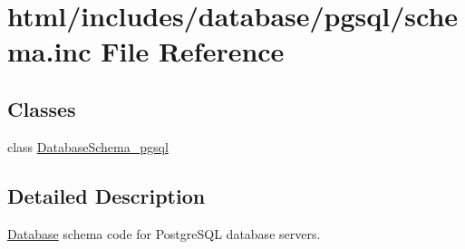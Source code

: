 \hypertarget{pgsql_2schema_8inc}{
\section{html/includes/database/pgsql/schema.inc File Reference}
\label{pgsql_2schema_8inc}
}
\subsection*{Classes}
\begin{DoxyCompactItemize}
\item 
class \hyperlink{classDatabaseSchema__pgsql}{DatabaseSchema\_\-pgsql}
\end{DoxyCompactItemize}


\subsection{Detailed Description}
\hyperlink{classDatabase}{Database} schema code for PostgreSQL database servers. 